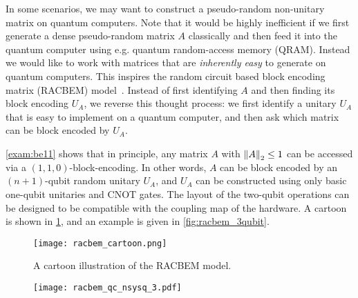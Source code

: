 \begin{exam}
In some scenarios, we may want to construct a pseudo-random non-unitary matrix on quantum computers. Note that it would be highly inefficient if we first generate a dense pseudo-random matrix $A$ classically and then feed it into the quantum computer using e.g. quantum random-access memory (QRAM). Instead we would like to work with matrices that are \emph{inherently easy} to generate on quantum computers. 
This inspires the random circuit based block encoding matrix (RACBEM) model~\cite{DongLin2021}. Instead of first identifying $A$ and then finding its block encoding $U_A$, we reverse this thought process: we first identify a unitary $U_A$ that is easy to implement on a quantum computer, and then ask which matrix can be block encoded by $U_A$. 


\cref{exam:be11} shows that in principle, any matrix $A$ with $\left\lVert A\right\rVert_2\le 1$ can be accessed via a $(1,1,0)$-block-encoding. In other words, $A$ can be block encoded by an $(n+1)$-qubit random unitary $U_A$, and $U_A$ can be constructed using only basic one-qubit unitaries and CNOT gates.
The layout of the two-qubit operations can be designed to be compatible with the coupling map of the hardware.  A cartoon is shown in \cref{fig:racbem_cartoon}, and an example is given in \cref{fig:racbem_3qubit}.

\begin{figure}[htbp]
\begin{center}
\texttt{[image: racbem\_cartoon.png]}
\caption{A cartoon illustration of the RACBEM model.}
\end{center}
\label{fig:racbem_cartoon}
\end{figure}

\begin{figure}[htbp]
    \centering
    \texttt{[image: racbem\_qc\_nsysq\_3.pdf]}
    

\end{figure}
\end{exam}
